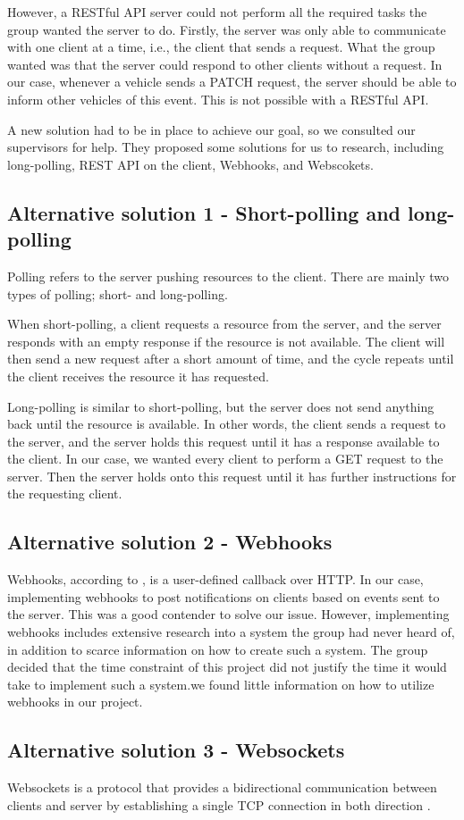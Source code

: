 However, a RESTful API server could not perform all the required tasks the group wanted the server to do. Firstly, the server was only able to communicate with one client at a time, i.e., the client that sends a request. What the group wanted was that the server could respond to other clients without a request. In our case, whenever a vehicle sends a PATCH request, the server should be able to inform other vehicles of this event. This is not possible with a RESTful API.

A new solution had to be in place to achieve our goal, so we consulted our supervisors for help. They proposed some solutions for us to research, including long-polling, REST API on the client, Webhooks, and Webscokets. 

\subsection{Alternative solution 1 - Short-polling and long-polling}
Polling refers to the server pushing resources to the client. There are mainly two types of polling; short- and long-polling. 

When short-polling, a client requests a resource from the server, and the server responds with an empty response if the resource is not available. The client will then send a new request after a short amount of time, and the cycle repeats until the client receives the resource it has requested.

Long-polling is similar to short-polling, but the server does not send anything back until the resource is available. In other words, the client sends a request to the server, and the server holds this request until it has a response available to the client. In our case, we wanted every client to perform a GET request to the server. Then the server holds onto this request until it has further instructions for the requesting client.

\subsection{Alternative solution 2 - Webhooks}
Webhooks, according to \cite{webhooks}, is a user-defined callback over HTTP. In our case, implementing webhooks to post notifications on clients based on events sent to the server. This was a good contender to solve our issue. However, implementing webhooks includes extensive research into a system the group had never heard of, in addition to scarce information on how to create such a system. The group decided that the time constraint of this project did not justify the time it would take to implement such a system.we found little information on how to utilize webhooks in our project.                                                                                                                                                                                                                       

\subsection{Alternative solution 3 - Websockets}
Websockets is a protocol that provides a bidirectional communication between clients and server by establishing a single TCP connection in both direction \parencite{rfc_websockets}.  
